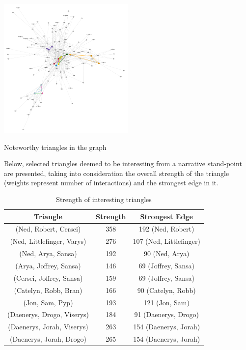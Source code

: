 \documentclass[10pt,twocolumn,letterpaper]{article}
\begin{document}
\begin{center}
    \includegraphics[width=0.5\textwidth]{img/s1/s1_triangles.jpg}
    \caption{\small{Noteworthy triangles in the graph}}
\end{center}

Below, selected triangles deemed to be interesting from a narrative stand-point are presented, taking into consideration the overall strength of the triangle (weights represent number of interactions) and the strongest edge in it. 


\begin{table}[]
    \centering
    \small
    \begin{tabular}{c|c|c}
        Triangle & Strength & Strongest Edge  \\
        \hline
        \small{(Ned, Robert, Cersei)} & 358 & 192 \small{(Ned, Robert)} \\
        \small{(Ned, Littlefinger, Varys)} & 276 & 107 \small{(Ned, Littlefinger)}\\
        \small{(Ned, Arya, Sansa)} & 192 & 90 \small{(Ned, Arya)}\\
        \small{(Arya, Joffrey, Sansa)} & 146 & 69 \small{(Joffrey, Sansa)}\\
        \small{(Cersei, Joffrey, Sansa)} & 159 & 69 \small{(Joffrey, Sansa)}\\
        \small{(Catelyn, Robb, Bran)} & 166 & 90 \small{(Catelyn, Robb)}\\
        \small{(Jon, Sam, Pyp)} & 193 & 121 \small{(Jon, Sam)} \\
        \small{(Daenerys, Drogo, Viserys)} & 184 & 91 \small{(Daenerys, Drogo)}\\
        \small{(Daenerys, Jorah, Viserys)} & 263 & 154 \small{(Daenerys, Jorah)}\\
        \small{(Daenerys, Jorah, Drogo)} & 265 & 154 \small{(Daenerys, Jorah)}\\
        \hline 
    \end{tabular} \\
    \caption{Strength of interesting triangles}
    \label{tab:my_label}
\end{table}
\end{document}
